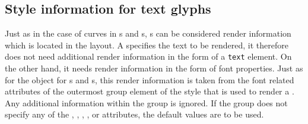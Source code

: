 \subsection{Style information for text glyphs}
Just as in the case of curves in {}s and {}s,
{}s can be considered render information which is located
in the layout. A  specifies the text to be rendered,
it therefore does not need additional render information in the form of
a \texttt{text} element. On the other hand, it needs render information in the form of font properties.
Just as for the \RenderCurve
object for {}s and {}s, this render information is
taken from the font related attributes of the outermost group element of the
style that is used to render a . Any additional information within the
group is ignored. If the group does not specify any of the ,
, , , 
 or  attributes, the default values are to be used.
